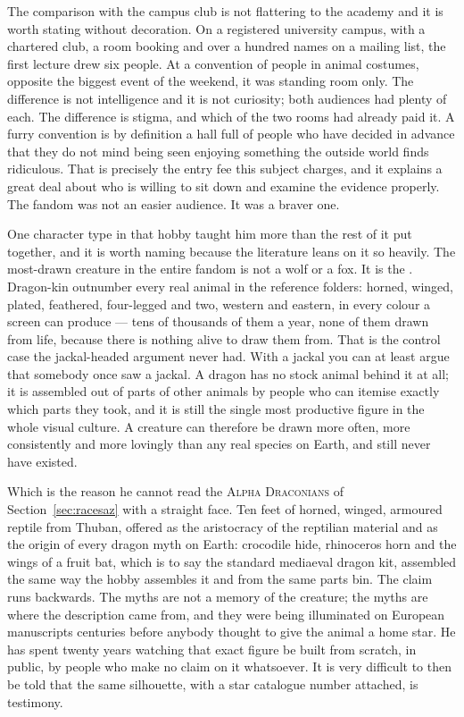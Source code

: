 \vspace{4pt}\par
\noindent The comparison with the campus club is not flattering to the academy and it is worth
stating without decoration. On a registered university campus, with a chartered club, a room
booking and over a hundred names on a mailing list, the first lecture drew six people. At a
convention of people in animal costumes, opposite the biggest event of the weekend, it was
standing room only. The difference is not intelligence and it is not curiosity; both audiences had
plenty of each. The difference is stigma, and which of the two rooms had already paid it. A furry
convention is by definition a hall full of people who have decided in advance that they do not mind
being seen enjoying something the outside world finds ridiculous. That is precisely the entry fee
this subject charges, and it explains a great deal about who is willing to sit down and examine the
evidence properly. The fandom was not an easier audience. It was a braver one.

\vspace{4pt}\par
\noindent One character type in that hobby taught him more than the rest of it put together, and it
is worth naming because the literature leans on it so heavily. The most-drawn creature in the
entire fandom is not a wolf or a fox. It is the . Dragon-kin outnumber every real
animal in the reference folders: horned, winged, plated, feathered, four-legged and two,
western and eastern, in every colour a screen can produce --- tens of thousands of them a year,
none of them drawn from life, because there is nothing alive to draw them from. That is the
control case the jackal-headed argument never had. With a jackal you can at least argue that
somebody once saw a jackal. A dragon has no stock animal behind it at all; it is assembled out
of parts of other animals by people who can itemise exactly which parts they took, and it is
still the single most productive figure in the whole visual culture. A creature can therefore be
drawn more often, more consistently and more lovingly than any real species on Earth, and still
never have existed.

\vspace{4pt}\par
\noindent Which is the reason he cannot read the \textsc{Alpha Draconians} of Section~\ref{sec:racesaz}
with a straight face. Ten feet of horned, winged, armoured reptile from Thuban, offered as the
aristocracy of the reptilian material and as the origin of every dragon myth on Earth: crocodile
hide, rhinoceros horn and the wings of a fruit bat, which is to say the standard mediaeval dragon
kit, assembled the same way the hobby assembles it and from the same parts bin. The claim runs
backwards. The myths are not a memory of the creature; the myths are where the description came
from, and they were being illuminated on European manuscripts centuries before anybody thought
to give the animal a home star. He has spent twenty years watching that exact figure be built
from scratch, in public, by people who make no claim on it whatsoever. It is very difficult to
then be told that the same silhouette, with a star catalogue number attached, is testimony.

